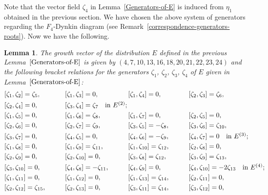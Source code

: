 \documentclass[11pt]{article}
\numberwithin{equation}{section}
\numberwithin{equation}{section}
\newtheorem{Lemma}[Theorem]{Lemma}
\theoremstyle{definition}
\newcommand{\0}{\boldsymbol{0}}
\begin{document}
Note that the vector field $\zeta_4$ in Lemma~\ref{Generators-of-E} is induced from $\eta_1$
obtained in the previous section. We have chosen the above system of generators regarding
the $F_4$-Dynkin diagram (see Remark~\ref{correspondence-generators-roots}).
Now we have the following.


\begin{Lemma}
\label{F_4-bracket-relations}
The growth vector of the distribution $E$ defined in the previous Lemma~$\ref{Generators-of-E}$
is given by $(4, 7, 10, 13, 16, 18, 20, 21, 22, 23, 24)$ and the following bracket relations for the generators
$\zeta_1$, $\zeta_2$, $\zeta_3$, $\zeta_4$ of $E$ given in Lemma~$\ref{Generators-of-E}$:
\begin{alignat*}{8}
&[\zeta_1, \zeta_2] = \zeta_5,\qquad&& [\zeta_1, \zeta_3] = 0,\qquad&& [\zeta_1, \zeta_4] = 0,\qquad&& [\zeta_2, \zeta_3] = \zeta_6,&\\
& [\zeta_2, \zeta_4] = 0,\qquad&& [\zeta_3, \zeta_4] = \zeta_7 \quad \makebox[0pt][l]{\text{in $E^{(2)}$;}}&
\\
&[\zeta_1, \zeta_5] = 0,\qquad&& [\zeta_1, \zeta_6] = \zeta_8,\qquad&& [\zeta_1, \zeta_7] = 0,\qquad&& [\zeta_2, \zeta_5] = 0,&\\
&
[\zeta_2, \zeta_6] = 0,\qquad&&[\zeta_2, \zeta_7] = \zeta_9,\qquad&&[\zeta_3, \zeta_5] = - \zeta_8,\qquad&& [\zeta_3, \zeta_6] = \zeta_{10},&\\
&[\zeta_3, \zeta_7] = 0,\qquad&& [\zeta_4, \zeta_5] = 0,\qquad&& [\zeta_4, \zeta_6] = - \zeta_9,\qquad&& [\zeta_4, \zeta_7] = 0 \quad \makebox[0pt][l]{\text{in $E^{(3)}$;}}&\\
&[\zeta_1, \zeta_8] = 0,\qquad&& [\zeta_1, \zeta_9] = \zeta_{11},\qquad&& [\zeta_1, \zeta_{10}] = \zeta_{12},\qquad&&
[\zeta_2, \zeta_8] = 0,&\\
& [\zeta_2, \zeta_9] = 0,\qquad&& [\zeta_2, \zeta_{10}] = 0,\qquad&& [\zeta_3, \zeta_8] = \zeta_{12},\qquad&&[\zeta_3, \zeta_9] = \zeta_{13},&
\\
&[\zeta_3, \zeta_{10}] = 0,\qquad&& [\zeta_4, \zeta_8] = - \zeta_{11},\qquad&& [\zeta_4, \zeta_9] = 0,\qquad&& [\zeta_4, \zeta_{10}] = - 2\zeta_{13} \quad \makebox[0pt][l]{\text{in $E^{(4)}$;}}&
\\
&[\zeta_1, \zeta_{11}] = 0,\qquad&& [\zeta_1, \zeta_{12}] = 0,\qquad&& [\zeta_1, \zeta_{13}] = \zeta_{14},\qquad&&
[\zeta_2, \zeta_{11}] = 0,& \\
&[\zeta_2, \zeta_{12}] = \zeta_{15},\qquad&& [\zeta_2, \zeta_{13}] = 0,\qquad&& [\zeta_3, \zeta_{11}] = \zeta_{14},\qquad&&[\zeta_3, \zeta_{12}] = 0,

\end{alignat*}
\end{Lemma}
\end{document}
